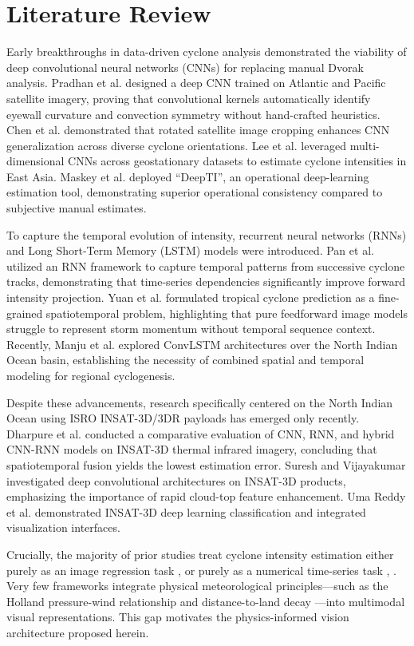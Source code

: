 \documentclass[conference]{IEEEtran}
\begin{document}
\section{Literature Review}
Early breakthroughs in data-driven cyclone analysis demonstrated the viability of deep convolutional neural networks (CNNs) for replacing manual Dvorak analysis. Pradhan et al. \cite{b1} designed a deep CNN trained on Atlantic and Pacific satellite imagery, proving that convolutional kernels automatically identify eyewall curvature and convection symmetry without hand-crafted heuristics. Chen et al. \cite{b3} demonstrated that rotated satellite image cropping enhances CNN generalization across diverse cyclone orientations. Lee et al. \cite{b5} leveraged multi-dimensional CNNs across geostationary datasets to estimate cyclone intensities in East Asia. Maskey et al. \cite{b6} deployed ``DeepTI'', an operational deep-learning estimation tool, demonstrating superior operational consistency compared to subjective manual estimates.

To capture the temporal evolution of intensity, recurrent neural networks (RNNs) and Long Short-Term Memory (LSTM) models were introduced. Pan et al. \cite{b2} utilized an RNN framework to capture temporal patterns from successive cyclone tracks, demonstrating that time-series dependencies significantly improve forward intensity projection. Yuan et al. \cite{b7} formulated tropical cyclone prediction as a fine-grained spatiotemporal problem, highlighting that pure feedforward image models struggle to represent storm momentum without temporal sequence context. Recently, Manju et al. \cite{b13} explored ConvLSTM architectures over the North Indian Ocean basin, establishing the necessity of combined spatial and temporal modeling for regional cyclogenesis.

Despite these advancements, research specifically centered on the North Indian Ocean using ISRO INSAT-3D/3DR payloads has emerged only recently. Dharpure et al. \cite{b4} conducted a comparative evaluation of CNN, RNN, and hybrid CNN-RNN models on INSAT-3D thermal infrared imagery, concluding that spatiotemporal fusion yields the lowest estimation error. Suresh and Vijayakumar \cite{b11} investigated deep convolutional architectures on INSAT-3D products, emphasizing the importance of rapid cloud-top feature enhancement. Uma Reddy et al. \cite{b12} demonstrated INSAT-3D deep learning classification and integrated visualization interfaces.

Crucially, the majority of prior studies treat cyclone intensity estimation either purely as an image regression task \cite{b1}, \cite{b3} or purely as a numerical time-series task \cite{b2}, \cite{b7}. Very few frameworks integrate physical meteorological principles—such as the Holland pressure-wind relationship \cite{b8} and distance-to-land decay \cite{b10}—into multimodal visual representations. This gap motivates the physics-informed vision architecture proposed herein.
\end{document}
